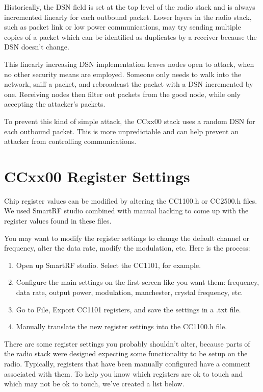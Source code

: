 \documentclass{article}
\begin{document}
Historically, the DSN field is set at the top level of the radio stack and is always incremented
linearly for each outbound packet.  Lower layers in the radio stack, such as packet link or low power communications,
may try sending multiple copies of a packet which can be identified as duplicates by a receiver because the 
DSN doesn't change.

This linearly increasing DSN implementation leaves nodes open to attack, when no other security means
are employed. Someone only needs to walk into the network, sniff a packet, and rebroadcast the packet
with a DSN incremented by one. Receiving nodes then filter out packets from the good node, while
only accepting the attacker's packets.

To prevent this kind of simple attack, the CCxx00 stack uses a random DSN for each outbound packet.
This is more unpredictable and can help prevent an attacker from controlling communications. 


\section{CCxx00 Register Settings}
\label{sec:Ccxx00RegisterSettings}
Chip register values can be modified by altering the CC1100.h or CC2500.h files. We used
SmartRF studio combined with manual hacking to come up with the register values found
in these files.

You may want to modify the register settings to change the default channel or frequency,
alter the data rate, modify the modulation, etc.  Here is the process:

\begin{enumerate}
	\item Open up SmartRF studio.  Select the CC1101, for example.
	\item Configure the main settings on the first screen like you want them: frequency,
	data rate, output power, modulation, manchester, crystal frequency, etc.
	\item Go to File, Export CC1101 registers, and save the settings in a .txt file.
	\item Manually translate the new register settings into the CC1100.h file.
\end{enumerate}

There are some register settings you probably shouldn't alter, because parts of the 
radio stack were designed expecting some functionality to be setup on the radio.
Typically, registers that have been manually configured have a comment associated with them.
To help you know which registers are ok to touch and which may not be ok to touch, 
we've created a list below.
\end{document}
